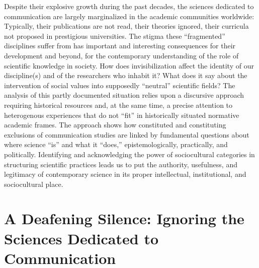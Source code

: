 \documentclass{tufte-handout}
\begin{document}
\begin{titlepage}

\noindent Despite their explosive growth during the past decades, the sciences
dedicated to communication are largely marginalized in the academic
communities worldwide: Typically, their publications are not read, their
theories ignored, their curricula not proposed in prestigious
universities. The stigma these ``fragmented'' disciplines suffer from
has important and interesting consequences for their development and
beyond, for the contemporary understanding of the role of scientific
knowledge in society. How does invisibilization affect the identity of
our discipline(s) and of the researchers who inhabit it? What does it
say about the intervention of social values into supposedly ``neutral''
scientific fields? The analysis of this partly documented situation
relies upon a discursive approach requiring historical resources and, at
the same time, a precise attention to heterogenous experiences that do
not ``fit'' in historically situated normative academic frames. The
approach shows how constituted and constituting exclusions of
communication studies are linked by fundamental questions about where
science ``is'' and what it ``does,'' epistemologically, practically, and
politically. Identifying and acknowledging the power of sociocultural
categories in structuring scientific practices leads us to put the
authority, usefulness, and legitimacy of contemporary science in its
proper intellectual, institutional, and sociocultural place.





\enlargethispage{2\baselineskip}

\vspace*{5em}




 \end{titlepage}

\hypertarget{a-deafening-silence-ignoring-the-sciences-dedicated-to-communication}{%
\section{A Deafening Silence: Ignoring the Sciences Dedicated to
\\\noindent Communication}\label{a-deafening-silence-ignoring-the-sciences-dedicated-to-communication}}
\end{document}

